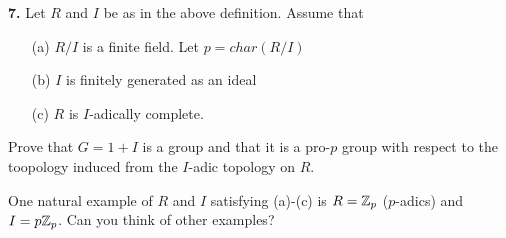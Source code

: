 \documentclass[12pt]{amsart}
\begin{document}
\skv
{\bf 7.} Let $R$ and $I$ be as in the above definition. Assume that
\begin{itemize}
\item[(a)] $R/I$ is a finite field. Let $p=char(R/I)$
\item[(b)] $I$ is finitely generated as an ideal
\item[(c)] $R$ is $I$-adically complete. 
\end{itemize}
Prove that $G=1+I$ is a group and that it is a pro-$p$ group with respect
to the toopology induced from the $I$-adic topology on $R$.

One natural example of $R$ and $I$ satisfying (a)-(c) is $R={\mathbb Z}_p$ ($p$-adics)
and $I=p{\mathbb Z}_p$. Can you think of other examples?
\end{document}
